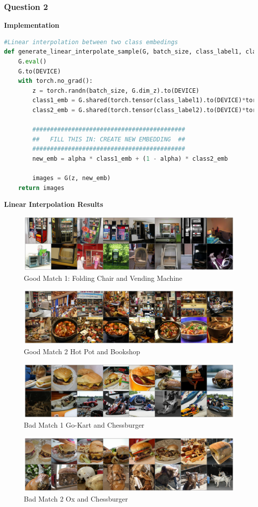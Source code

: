 \documentclass{article}
\begin{document}
	\subsubsection{Question 2}
	\textbf{Implementation}
	\begin{lstlisting}[language=python]
#Linear interpolation between two class embedings
def generate_linear_interpolate_sample(G, batch_size, class_label1, class_label2, alpha):
  	G.eval()
  	G.to(DEVICE)
  	with torch.no_grad():
	    z = torch.randn(batch_size, G.dim_z).to(DEVICE)
	    class1_emb = G.shared(torch.tensor(class_label1).to(DEVICE)*torch.ones((batch_size,)).to(DEVICE).long())
	    class2_emb = G.shared(torch.tensor(class_label2).to(DEVICE)*torch.ones((batch_size,)).to(DEVICE).long())
	
	    ###########################################
	    ##   FILL THIS IN: CREATE NEW EMBEDDING  ##
	    ###########################################    
	    new_emb = alpha * class1_emb + (1 - alpha) * class2_emb
	
	    images = G(z, new_emb)
  	return images
	\end{lstlisting}
	\textbf{Linear Interpolation Results}
	\begin{figure}[H]
		\caption{Good Match 1: Folding Chair and Vending Machine}
		\centering
		\medbreak
		\includegraphics[width=0.7\linewidth]{./foldingchair_vendingmachine.png}
	\end{figure}

	\begin{figure}[H]
		\caption{Good Match 2 Hot Pot and Bookshop}
		\centering
		\medbreak
		\includegraphics[width=0.7\linewidth]{./hotpot_bookshop.png}
	\end{figure}
	
	\begin{figure}[H]
		\caption{Bad Match 1 Go-Kart and Chessburger}
		\centering
		\medbreak
		\includegraphics[width=0.7\linewidth]{./gokart_cheeseburger.png}
	\end{figure}

	\begin{figure}[H]
		\caption{Bad Match 2 Ox and Chessburger}
		\centering
		\medbreak
		\includegraphics[width=0.7\linewidth]{./ox_chessburger.png}
	\end{figure}
\end{document}
